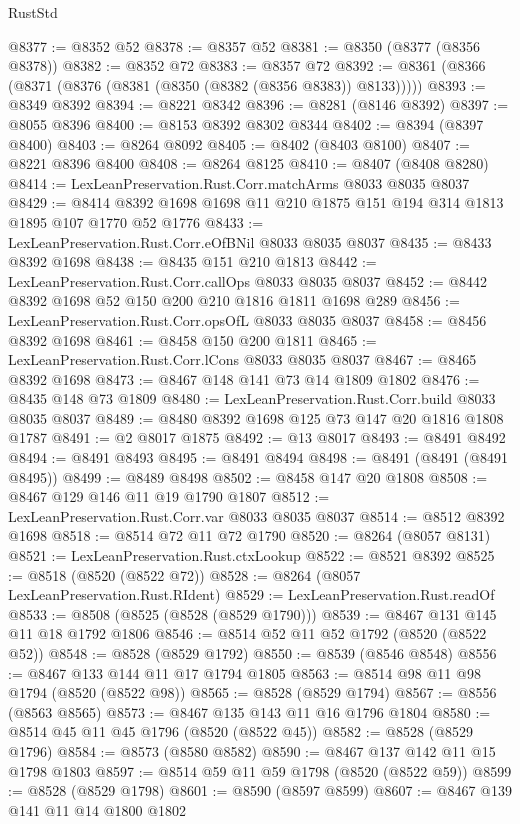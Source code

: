 \begin{lexlean}{RustStd}
\begin{coremodule}
@8377 := @8352 @52
@8378 := @8357 @52
@8381 := @8350 (@8377 (@8356 @8378))
@8382 := @8352 @72
@8383 := @8357 @72
@8392 := @8361 (@8366 (@8371 (@8376 (@8381 (@8350 (@8382 (@8356 @8383)) @8133)))))
@8393 := @8349 @8392
@8394 := @8221 @8342
@8396 := @8281 (@8146 @8392)
@8397 := @8055 @8396
@8400 := @8153 @8392 @8302 @8344
@8402 := @8394 (@8397 @8400)
@8403 := @8264 @8092
@8405 := @8402 (@8403 @8100)
@8407 := @8221 @8396 @8400
@8408 := @8264 @8125
@8410 := @8407 (@8408 @8280)
@8414 := LexLeanPreservation.Rust.Corr.matchArms @8033 @8035 @8037
@8429 := @8414 @8392 @1698 @1698 @11 @210 @1875 @151 @194 @314 @1813 @1895 @107 @1770 @52 @1776
@8433 := LexLeanPreservation.Rust.Corr.eOfBNil @8033 @8035 @8037
@8435 := @8433 @8392 @1698
@8438 := @8435 @151 @210 @1813
@8442 := LexLeanPreservation.Rust.Corr.callOps @8033 @8035 @8037
@8452 := @8442 @8392 @1698 @52 @150 @200 @210 @1816 @1811 @1698 @289
@8456 := LexLeanPreservation.Rust.Corr.opsOfL @8033 @8035 @8037
@8458 := @8456 @8392 @1698
@8461 := @8458 @150 @200 @1811
@8465 := LexLeanPreservation.Rust.Corr.lCons @8033 @8035 @8037
@8467 := @8465 @8392 @1698
@8473 := @8467 @148 @141 @73 @14 @1809 @1802
@8476 := @8435 @148 @73 @1809
@8480 := LexLeanPreservation.Rust.Corr.build @8033 @8035 @8037
@8489 := @8480 @8392 @1698 @125 @73 @147 @20 @1816 @1808 @1787
@8491 := @2 @8017 @1875
@8492 := @13 @8017
@8493 := @8491 @8492
@8494 := @8491 @8493
@8495 := @8491 @8494
@8498 := @8491 (@8491 (@8491 @8495))
@8499 := @8489 @8498
@8502 := @8458 @147 @20 @1808
@8508 := @8467 @129 @146 @11 @19 @1790 @1807
@8512 := LexLeanPreservation.Rust.Corr.var @8033 @8035 @8037
@8514 := @8512 @8392 @1698
@8518 := @8514 @72 @11 @72 @1790
@8520 := @8264 (@8057 @8131)
@8521 := LexLeanPreservation.Rust.ctxLookup
@8522 := @8521 @8392
@8525 := @8518 (@8520 (@8522 @72))
@8528 := @8264 (@8057 LexLeanPreservation.Rust.RIdent)
@8529 := LexLeanPreservation.Rust.readOf
@8533 := @8508 (@8525 (@8528 (@8529 @1790)))
@8539 := @8467 @131 @145 @11 @18 @1792 @1806
@8546 := @8514 @52 @11 @52 @1792 (@8520 (@8522 @52))
@8548 := @8528 (@8529 @1792)
@8550 := @8539 (@8546 @8548)
@8556 := @8467 @133 @144 @11 @17 @1794 @1805
@8563 := @8514 @98 @11 @98 @1794 (@8520 (@8522 @98))
@8565 := @8528 (@8529 @1794)
@8567 := @8556 (@8563 @8565)
@8573 := @8467 @135 @143 @11 @16 @1796 @1804
@8580 := @8514 @45 @11 @45 @1796 (@8520 (@8522 @45))
@8582 := @8528 (@8529 @1796)
@8584 := @8573 (@8580 @8582)
@8590 := @8467 @137 @142 @11 @15 @1798 @1803
@8597 := @8514 @59 @11 @59 @1798 (@8520 (@8522 @59))
@8599 := @8528 (@8529 @1798)
@8601 := @8590 (@8597 @8599)
@8607 := @8467 @139 @141 @11 @14 @1800 @1802

\end{coremodule}
\end{lexlean}
